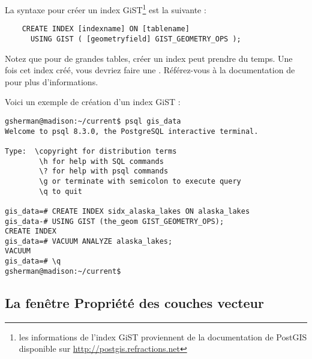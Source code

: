 La syntaxe pour créer un index GiST\footnote{les informations de l'index GiST proviennent de la documentation de PostGIS disponible sur \url{http://postgis.refractions.net}} est la suivante :

\begin{verbatim}
    CREATE INDEX [indexname] ON [tablename]
      USING GIST ( [geometryfield] GIST_GEOMETRY_OPS );
\end{verbatim}

Notez que pour de grandes tables, créer un index peut prendre du temps. Une fois cet index créé, vous devriez faire une . Référez-vous à la documentation de \cite{PostGISweb} pour plus d'informations.

Voici un exemple de création d'un index GiST :
\begin{verbatim}
gsherman@madison:~/current$ psql gis_data
Welcome to psql 8.3.0, the PostgreSQL interactive terminal.

Type:  \copyright for distribution terms
        \h for help with SQL commands
        \? for help with psql commands
        \g or terminate with semicolon to execute query
        \q to quit

gis_data=# CREATE INDEX sidx_alaska_lakes ON alaska_lakes
gis_data-# USING GIST (the_geom GIST_GEOMETRY_OPS);
CREATE INDEX
gis_data=# VACUUM ANALYZE alaska_lakes;
VACUUM
gis_data=# \q
gsherman@madison:~/current$
\end{verbatim}

\subsection{La fenêtre Propriété des couches vecteur}\label{sec:vectorprops}

